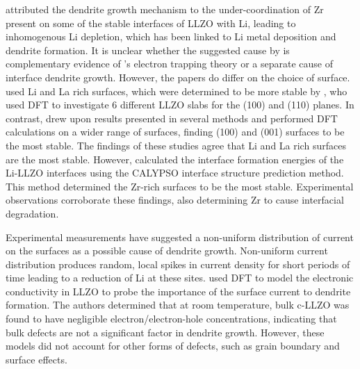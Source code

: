 \documentclass[../main.tex]{subfiles}
\begin{document}
\citeauthor{Gao2020} attributed the dendrite growth mechanism to the under-coordination of Zr present on some of the stable interfaces of LLZO with Li,\cite{Gao2020} leading to inhomogenous Li depletion, which has been linked to Li metal deposition and dendrite formation. It is unclear whether the suggested cause by \citeauthor{Gao2020} is complementary evidence of \citeauthor{Tian2018}'s electron trapping theory or a separate cause of interface dendrite growth. However, the papers do differ on the choice of surface. \citeauthor{Tian2018} used Li and La rich surfaces, which were determined to be more stable by \citeauthor{Thompson2017}, who used DFT to investigate 6 different LLZO slabs for the (100) and (110) planes.\cite{Thompson2017} In contrast, \citeauthor{Gao2020} drew upon results presented in several methods\cite{Thompson2017, Canepa2018, Yu2016a} and performed DFT calculations on a wider range of surfaces, finding (100) and (001) surfaces to be the most stable. The findings of these studies agree that Li and La rich surfaces are the most stable. However, \citeauthor{Gao2020} calculated the interface formation energies of the Li-LLZO interfaces using the CALYPSO interface structure prediction method\cite{Wang2012, Gao2019}. This method determined the Zr-rich surfaces to be the most stable. Experimental observations corroborate these findings, also determining Zr to cause interfacial degradation\cite{Zhu2019}.

Experimental measurements have suggested a non-uniform distribution of current on the surfaces as a possible cause of dendrite growth.\cite{Han2019_dendrite, Aguesse2017} Non-uniform current distribution produces random, local spikes in current density for short periods of time leading to a reduction of Li at these sites.  \citeauthor{squires_2020} used DFT to model the electronic conductivity in LLZO to probe the importance of the surface current to dendrite formation.\cite{squires_2020} The authors determined that at room temperature, bulk c-LLZO was found to have negligible electron/electron-hole concentrations, indicating that bulk defects are not a significant factor in dendrite growth. However, these models did not account for other forms of defects, such as grain boundary and surface effects. 
\end{document}

